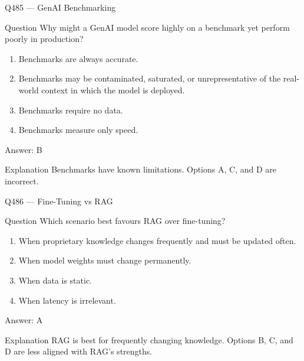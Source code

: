 \documentclass[aspectratio=169,8pt]{beamer}
\begin{document}
	\begin{frame}{Q485 --- GenAI Benchmarking}
		\begin{block}{Question}
			Why might a GenAI model score highly on a benchmark yet perform poorly in production?
			\begin{enumerate}
				\item Benchmarks are always accurate.
				\item Benchmarks may be contaminated, saturated, or unrepresentative of the real-world context in which the model is deployed.
				\item Benchmarks require no data.
				\item Benchmarks measure only speed.
			\end{enumerate}
		\end{block}
		\begin{exampleblock}{Answer: B}\end{exampleblock}
		\begin{block}{Explanation}
			Benchmarks have known limitations. Options A, C, and D are incorrect.
		\end{block}
	\end{frame}
	
	\begin{frame}{Q486 --- Fine-Tuning vs RAG}
		\begin{block}{Question}
			Which scenario best favours RAG over fine-tuning?
			\begin{enumerate}
				\item When proprietary knowledge changes frequently and must be updated often.
				\item When model weights must change permanently.
				\item When data is static.
				\item When latency is irrelevant.
			\end{enumerate}
		\end{block}
		\begin{exampleblock}{Answer: A}\end{exampleblock}
		\begin{block}{Explanation}
			RAG is best for frequently changing knowledge. Options B, C, and D are less aligned with RAG's strengths.
		\end{block}
	\end{frame}
	
\end{document}
